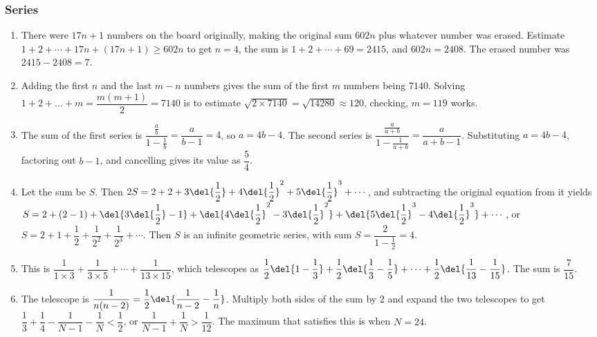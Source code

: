 \documentclass[10pt,paper=letter]{scrartcl}
\begin{document}
\subsubsection*{Series}

\begin{enumerate}

\item There were $17n+1$ numbers on the board originally, making the original sum $602n$ plus whatever number was erased. Estimate $1 + 2 + \cdots + 17n + (17n + 1) \geq 602n$ to get $n = 4$, the sum is $1 + 2 + \cdots + 69 = 2415$, and $602n = 2408$. The erased number was $2415 - 2408 = 7$.

\item Adding the first $n$ and the last $m-n$ numbers gives the sum of the first $m$ numbers being $7140$. Solving $1 + 2 + \ldots + m = \dfrac{m(m+1)}2 = 7140$ is to estimate $\sqrt{2 \times 7140} = \sqrt{14280} \approx 120$, checking, $m = 119$ works.

\item The sum of the first series is $\dfrac{\frac{a}b}{1 - \frac1b} = \dfrac{a}{b -1} = 4$, so $a = 4b - 4$. The second series is $\dfrac{\frac{a}{a+b}}{1 - \frac1{a+b}} = \dfrac{a}{a + b - 1}$. Substituting $a = 4b - 4$, factoring out $b - 1$, and cancelling gives its value as $\dfrac54$.

\item Let the sum be $S$. Then $2S = 2 + 2 + 3\del{\dfrac12} + 4\del{\dfrac12}^2 + 5\del{\dfrac12}^3 + \cdots$, and subtracting the original equation from it yields $S = 2 + (2 - 1) + \del{3\del{\dfrac12} - 1} + \del{4\del{\dfrac12}^2 - 3\del{\dfrac12}^2} + \del{5\del{\dfrac12}^3 - 4\del{\dfrac12}^3} + \cdots$, or $S = 2 + 1 + \dfrac12 + \dfrac1{2^2} + \dfrac1{2^3} + \cdots$. Then $S$ is an infinite geometric series, with sum $S = \dfrac2{1-\frac12} = 4$.

\item This is $\dfrac1{1\times3} + \dfrac1{3\times5} + \cdots + \dfrac1{13\times15}$, which telescopes as $\dfrac12\del{1 - \dfrac13} + \dfrac12\del{\dfrac13 - \dfrac15} + \cdots + \dfrac12\del{\dfrac1{13} - \dfrac1{15}}$. The sum is $\dfrac7{15}$.

\item The telescope is $\dfrac1{n(n-2)} = \dfrac12\del{\dfrac1{n-2} - \dfrac1n}$. Multiply both sides of the sum by $2$ and expand the two telescopes to get $\dfrac13 + \dfrac14 - \dfrac1{N-1} - \dfrac1N < \dfrac12$, or $\dfrac1{N-1} + \dfrac1N > \dfrac1{12}$. The maximum that satisfies this is when $N = 24$.


\end{enumerate}
\end{document}
